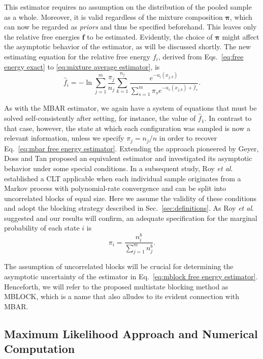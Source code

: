 \documentclass[aip,jcp,reprint,amsmath,amssymb]{revtex4-1}
\newcommand{\vt}[1]{\boldsymbol{\mathbf{#1}}}           %
\begin{document}
This estimator requires no assumption on the distribution of the pooled sample as a whole. Moreover, it is valid regardless of the mixture composition $\vt \pi$, which can now be regarded as \textit{priors} and thus be specified beforehand. This leaves only the relative free energies $\vt f$ to be estimated. Evidently, the choice of $\vt \pi$ might affect the asymptotic behavior of the estimator, as will be discussed shortly. The new estimating equation for the relative free energy $f_i$, derived from Eqs.~\eqref{eq:free energy exact} to \eqref{eq:mixture average estimator}, is
\begin{equation}
\label{eq:mblock free energy estimator}
{\hat f}_i = -\ln \sum_{j=1}^m \frac{\pi_j}{n_j} \sum_{k=1}^{n_j} \frac{e^{-u_i(x_{j,k})}}{\sum_{s=1}^m \pi_s e^{-u_s(x_{j,k}) + {\hat f}_s}}.
\end{equation}

As with the MBAR estimator, we again have a system of equations that must be solved self-consistently after setting, for instance, the value of $\hat f_1$. In contrast to that case, however, the state at which each configuration was sampled is now a relevant information, unless we specify $\pi_j = {n_j}/{n}$ in order to recover Eq.~\eqref{eq:mbar free energy estimator}. Extending the approach pioneered by Geyer,\cite{Geyer_1994} Doss and Tan\cite{Doss_2014} proposed an equivalent estimator and investigated its asymptotic behavior under some special conditions. In a subsequent study, Roy \textit{et al}.\cite{Roy_2018} established a CLT applicable when each individual sample originates from a Markov process with polynomial-rate convergence and can be split into uncorrelated blocks of equal size. Here we assume the validity of these conditions and adopt the blocking strategy described in Sec.~\ref{sec:definitions}. As Roy \textit{et al}.\cite{Roy_2018} suggested and our results will confirm, an adequate specification for the marginal probability of each state $i$ is
\begin{equation}
\label{eq:mblock prior}
\pi_i = \frac{n^b_i}{\sum_{j=1}^m n^b_j}.
\end{equation}

The assumption of uncorrelated blocks will be crucial for determining the asymptotic uncertainty of the estimator in Eq.~\eqref{eq:mblock free energy estimator}. Henceforth, we will refer to the proposed multistate blocking method as MBLOCK, which is a name that also alludes to its evident connection with MBAR.

\subsection{Maximum Likelihood Approach and Numerical Computation}
\end{document}
